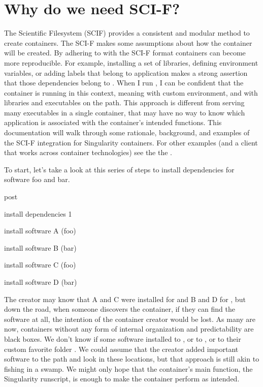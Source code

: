 \documentclass[letterpaper,10pt,english]{sphinxmanual}
\begin{document}
\section{Why do we need SCI-F?}
\label{\detokenize{reproducible_scif_apps:why-do-we-need-sci-f}}\label{\detokenize{reproducible_scif_apps:sec-scifapps}}
The Scientific Filesystem (SCIF) provides a consistent and modular method to create containers.
The SCI-F makes some assumptions about how the container will be created. By adhering to with the SCI-F format containers can become more reproducible.
For example, installing a set of libraries, defining environment variables, or adding labels that
belong to application  makes a strong assertion that those dependencies belong
to . When I run , I can be confident that the container is running
in this context, meaning with  custom environment, and with  libraries
and executables on the path. This approach is different from
serving many executables in a single container, that may have no way to know which application is associated with the container’s
intended functions. This documentation will walk through some
rationale, background, and examples of the SCI-F integration for
Singularity containers. For other examples (and a client that works
across container technologies) see the the .

To start, let’s take a look at this series of steps to install
dependencies for software foo and bar.

%
\begin{sphinxVerbatim}[commandchars=\\\{\}]
\PYGZpc{}post


\PYGZsh{} install dependencies 1

\PYGZsh{} install software A (foo)

\PYGZsh{} install software B (bar)

\PYGZsh{} install software C (foo)

\PYGZsh{} install software D (bar)
\end{sphinxVerbatim}

The creator may know that A and C were installed for  and B and D for  ,
but down the road, when someone discovers the container, if they can
find the software at all, the intention of the container creator would
be lost. As many are now, containers without any form of internal
organization and predictability are black boxes. We don’t know if some
software installed to  , or to   , or to their custom favorite folder  . We
could assume that the creator added important software to the path and
look in these locations, but that approach is still akin to fishing in a
swamp. We might only hope that the container’s main function, the
Singularity runscript, is enough to make the container perform as
intended.
\end{document}
